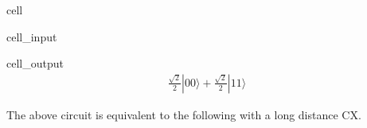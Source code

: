 \documentclass[letterpaper,10pt,english]{jupyterBook}
\begin{document}
\begin{sphinxuseclass}{cell}\begin{sphinxVerbatimInput}

\begin{sphinxuseclass}{cell_input}
\begin{sphinxVerbatim}[commandchars=\\\{\}]
    
   \PYG{p}{[}\PYG{p}{]}
  
\end{sphinxVerbatim}

\end{sphinxuseclass}\end{sphinxVerbatimInput}
\begin{sphinxVerbatimOutput}

\begin{sphinxuseclass}{cell_output}\begin{equation*}
\begin{split}\frac{\sqrt{2}}{2} |00\rangle+\frac{\sqrt{2}}{2} |11\rangle\end{split}
\end{equation*}
\end{sphinxuseclass}\end{sphinxVerbatimOutput}

\end{sphinxuseclass}
\sphinxAtStartPar
The above circuit is equivalent to the following with a long distance CX.
\end{document}
